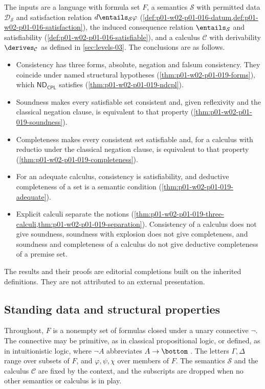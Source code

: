 The inputs are a language with formula set \(F\), a semantics
\(\mathcal S\) with permitted data \(\mathcal D_{\mathcal S}\) and
satisfaction relation \(d\entails_{\mathcal S}\varphi\)
(\cref{def:p01-w02-p01-016-datum,def:p01-w02-p01-016-satisfaction}), the
induced consequence relation \(\entails_{\mathcal S}\) and satisfiability
(\cref{def:p01-w02-p01-016-satisfiable}), and a calculus \(\mathcal C\) with
derivability \(\derives_{\mathcal C}\) as defined in \cref{sec:levels-03}. The
conclusions are as follows.
\begin{itemize}
  \item Consistency has three forms, absolute, negation and falsum
        consistency. They coincide under named structural hypotheses
        (\cref{thm:p01-w02-p01-019-forms}), which
        \(\mathsf{ND}_{\mathsf{CPL}}\) satisfies
        (\cref{thm:p01-w02-p01-019-ndcpl}).
  \item Soundness makes every satisfiable set consistent and, given
        reflexivity and the classical negation clause, is equivalent to that
        property (\cref{thm:p01-w02-p01-019-soundness}).
  \item Completeness makes every consistent set satisfiable and, for a
        calculus with reductio under the classical negation clause, is
        equivalent to that property (\cref{thm:p01-w02-p01-019-completeness}).
  \item For an adequate calculus, consistency is satisfiability, and
        deductive completeness of a set is a semantic condition
        (\cref{thm:p01-w02-p01-019-adequate}).
  \item Explicit calculi separate the notions
        (\cref{thm:p01-w02-p01-019-three-calculi,thm:p01-w02-p01-019-separation}).
        Consistency of a calculus does not give soundness, soundness with
        explosion does not give completeness, and soundness and completeness
        of a calculus do not give deductive completeness of a premise set.
\end{itemize}
The results and their proofs are editorial completions built on the
inherited definitions. They are not attributed to an external presentation.

\subsection{Standing data and structural properties}
\label{sec:p01-w02-p01-019-standing}

Throughout, \(F\) is a nonempty set of formulas closed under a unary
connective \(\neg\). The connective may be primitive, as in classical
propositional logic, or defined, as in intuitionistic logic, where
\(\neg A\) abbreviates \(A\to\bottom\)
\cite[ch.~``Intuitionistic Logic'', sec.~``Language, calculus, and Kripke
structures'']{FrozenFormalLogicConsistencyComparison}. The letters
\(\Gamma,\Delta\) range over subsets of \(F\), and
\(\varphi,\psi,\chi\) over members of \(F\). The semantics \(\mathcal S\) and
the calculus \(\mathcal C\) are fixed by the context, and the subscripts are
dropped when no other semantics or calculus is in play.


